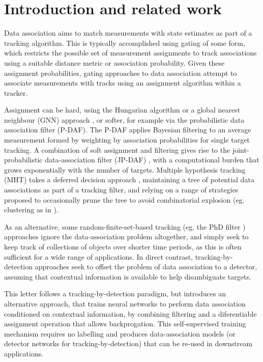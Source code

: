 \documentclass[journal]{IEEEtran}
\begin{document}
\section{Introduction and related work}

Data association aims to match measurements with state estimates as part of a tracking algorithm. This is typically accomplished using gating of some form, which restricts the possible set of measurement assignments to track associations using a suitable distance metric or association probability. Given these assignment probabilities, gating approaches to data association \cite{blackman1986multiple} attempt to associate measurements with tracks using an assignment algorithm within a tracker. 

Assignment can be hard, using the Hungarian algorithm \cite{kuhn1955hungarian} or a global nearest neighbour (GNN) approach \cite{bar1995multitarget}, or softer, for example via the probabilistic data association filter (P-DAF). The P-DAF \cite{bar1975tracking} applies Bayesian filtering to an average measurement formed by weighting by association probabilities \cite{Vo15} for single target tracking. A combination of soft assignment and filtering gives rise to the joint-probabilistic data-association filter (JP-DAF) \cite{bar1990tracking,barshalom09}, with a computational burden that grows exponentially with the number of targets. Multiple hypothesis tracking (MHT) \cite{Reid79, streit1995probabilistic} takes a deferred decision approach \cite{Vo15}, maintaining a tree of potential data associations as part of a tracking filter, and relying on a range of strategies proposed to occasionally prune the tree to avoid combinatorial explosion (eg. clustering as in \cite{Reid79}). 

As an alternative, some random-finite-set-based tracking (eg. the PhD filter \cite{Vo06}) approaches ignore the data-association problem altogether, and simply seek to keep track of collections of objects over shorter time periods, as this is often sufficient for a wide range of applications. In direct contrast, tracking-by-detection \cite{Bewley16,Bergmann2019TrackingWB} approaches seek to offset the problem of data association to a detector, assuming that contextual information is available to help disambiguate targets. 

This letter follows a tracking-by-detection paradigm, but introduces an alternative approach, that trains neural networks to perform data association conditioned on contextual information, by combining filtering and a diferentiable assignment operation that allows backprogation. This self-supervised training mechanism requires no labelling and produces data-association models (or detector networks for tracking-by-detection) that can be re-used in downstream applications. 
\end{document}
